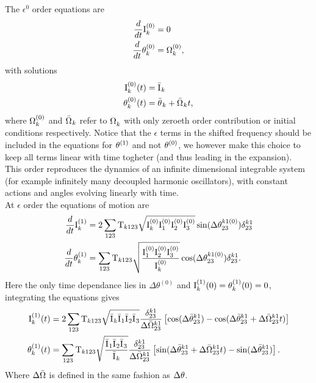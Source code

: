 The $\epsilon^0$ order equations are
\begin{align}
    \frac{d}{dt}\mathrm{I}^{(0)}_k &= 0   \\
    \frac{d}{dt}\theta^{(0)}_k &= \Omega^{(0)}_k, 
\end{align}
with solutions 
\begin{align}
    \mathrm{I}^{(0)}_k(t) &= \bar{\mathrm{I}^{}}_k \label{solzero1}\\
    \theta^{(0)}_k(t) &= \bar{\theta^{}}_k + \bar{\Omega^{}}_kt, \label{solzero2}
\end{align}
where $\Omega^{(0)}_k$ and $\bar{\Omega^{}}_k$ refer to $\Omega^{}_k$ with only zeroeth order contribution or initial conditions respectively.
Notice that the $\epsilon$ terms in 
the shifted frequency should be included in the equations for $\theta^{(1)}$ and not $\theta^{(0)}$, we however make this choice to keep 
all terms linear with time togheter (and thus leading in the expansion).\\
This order reproduces the dynamics of an infinite dimensional integrable system (for example infinitely many decoupled harmonic oscillators), with constant actions and angles evolving linearly with time. \\

At $\epsilon$ order the equations of motion are 
\begin{align}
    \frac{d}{dt}\mathrm{I}^{(1)}_k &= 2\sum_{123} \mathrm{T}_{k123} \sqrt{\mathrm{I}^{(0)}_k\mathrm{I}^{(0)}_1\mathrm{I}^{(0)}_2\mathrm{I}^{(0)}_3} \sin(\Delta\theta^{k1(0)}_{23})\delta^{k1}_{23} \label{hameqone}\\
    \frac{d}{dt}\theta^{(1)}_k &= \sum_{123} \mathrm{T}_{k123} \sqrt{\frac{\mathrm{I}^{(0)}_1\mathrm{I}^{(0)}_2\mathrm{I}^{(0)}_3}{\mathrm{I}^{(0)}_k}}\cos(\Delta\theta^{k1(0)}_{23})\delta^{k1}_{23}.
\end{align}
Here the only time dependance lies in $\Delta\theta^{(0)}$ and $\mathrm{I}^{(1)}_k(0) = \theta^{(1)}_k(0) = 0$, integrating the equations gives
\begin{align}
    \mathrm{I}^{(1)}_k(t) &= 2\sum_{123} \mathrm{T}_{k123} \sqrt{\bar{\mathrm{I}^{}}_k\bar{\mathrm{I}^{}}_1\bar{\mathrm{I}^{}}_2\bar{\mathrm{I}^{}}_3} \frac{\delta^{k1}_{23}}{\Delta\bar{\Omega}^{k1}_{23}}
    \left[ \cos(\Delta\bar{\theta}^{k1}_{23}) - \cos(\Delta\bar{\theta}^{k1}_{23} + \Delta\bar{\Omega}^{k1}_{23}t) \right] \label{solone1}\\
    \theta^{(1)}_k(t) &= \sum_{123} \mathrm{T}_{k123} \sqrt{\frac{\bar{\mathrm{I}^{}}_1\bar{\mathrm{I}^{}}_2\bar{\mathrm{I}^{}}_3}{\bar{\mathrm{I}^{}}_k}} \frac{\delta^{k1}_{23}}{\Delta\bar{\Omega}^{k1}_{23}}
    \left[ \sin(\Delta\bar{\theta}^{k1}_{23} + \Delta\bar{\Omega}^{k1}_{23}t) -\sin(\Delta\bar{\theta}^{k1}_{23}) \right]. \label{solone2}
\end{align}
Where $\Delta\bar{\Omega}$ is defined in the same fashion as $\Delta\theta$. \\


